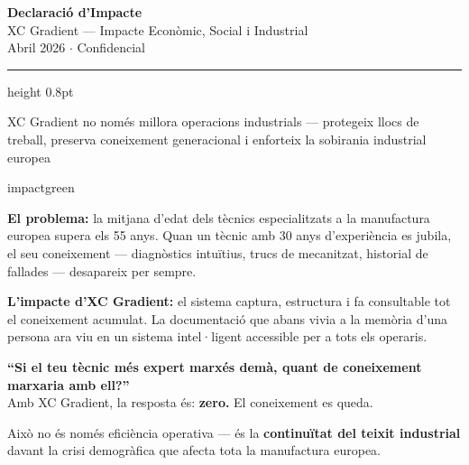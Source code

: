 \documentclass[11pt,a4paper]{article}
\begin{document}
\begin{center}
{\LARGE\bfseries\color{dark} Declaració d'Impacte}\\[0.15em]
{\large\color{accent} XC Gradient --- Impacte Econòmic, Social i Industrial}\\[0.4em]
{\small\color{midgray} Abril 2026 $\cdot$ Confidencial}
\end{center}

\vspace{0.2em}
{\color{accent}\hrule height 0.8pt}
\vspace{0.5em}

\begin{center}
\colorbox{accent}{\color{white}\small\bfseries\strut\quad XC Gradient no només millora operacions industrials --- protegeix llocs de treball, preserva coneixement generacional i enforteix la sobirania industrial europea \quad}
\end{center}

\vspace{0.6em}


\begin{impactcard}{impactgreen}

\textbf{El problema:} la mitjana d'edat dels tècnics especialitzats a la manufactura europea supera els 55 anys. Quan un tècnic amb 30 anys d'experiència es jubila, el seu coneixement --- diagnòstics intuïtius, trucs de mecanitzat, historial de fallades --- desapareix per sempre.

\textbf{L'impacte d'XC Gradient:} el sistema captura, estructura i fa consultable tot el coneixement acumulat. La documentació que abans vivia a la memòria d'una persona ara viu en un sistema intel·ligent accessible per a tots els operaris.

\begin{center}
\colorbox{softgreen}{\parbox{0.9\linewidth}{\centering\small
\textbf{``Si el teu tècnic més expert marxés demà, quant de coneixement marxaria amb ell?''}\\
Amb XC Gradient, la resposta és: \textbf{zero.} El coneixement es queda.
}}
\end{center}

Això no és només eficiència operativa --- és la \textbf{continuïtat del teixit industrial} davant la crisi demogràfica que afecta tota la manufactura europea.
\end{impactcard}
\end{document}
